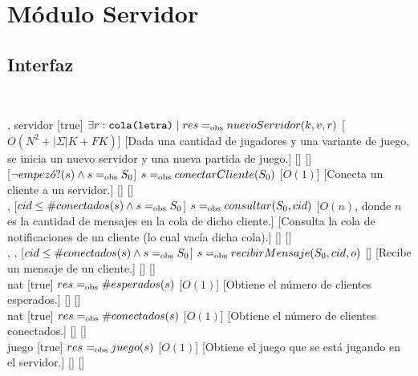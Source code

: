 \section{Módulo Servidor}
\begin{interfaz}{\subsection{Interfaz}}
  \\
  \usa{\falta}
  \par\noindent
  \begin{operaciones}
    {
      ,
    }{servidor}
    [true]
    {$\exists r: \texttt{cola(letra)} \mid res =_{\mathrm{obs}} nuevoServidor(k,v,r)$}
    [$O(N^{2}+|\Sigma|K+FK)$]
    [Dada una cantidad de jugadores y una variante de juego, se inicia un nuevo servidor y una nueva partida de juego.]
    [\falta]
    [\falta]\\

    \noindent{}
    {
    }{}
    [$\lnot empez\acute{o}?(s) \land s=_{\mathrm{obs}} S_{0}$]
    {$s=_{\mathrm{obs}} conectarCliente(S_{0})$}
    [$O(1)$]
    [Conecta un cliente a un servidor.]
    [\falta]
    [\falta]\\

    \noindent{}
    {
      ,
    }{}
    [$cid\leq \#conectados(s) \land s=_{\mathrm{obs}} S_{0}$]
    {$s=_{\mathrm{obs}} consultar(S_{0},cid)$}
    [$O(n)$, donde $n$ es la cantidad de mensajes en la cola de dicho cliente.]
    [Consulta la cola de notificaciones de un cliente (lo cual vacía dicha cola).]
    [\falta]
    [\falta]\\

    \noindent{}
    {
      ,
      ,
    }{}
    [$cid\leq \#conectados(s) \land s=_{\mathrm{obs}} S_{0}$]
    {$s=_{\mathrm{obs}} recibirMensaje(S_{0},cid,o)$}
    [\falta]
    [Recibe un mensaje de un cliente.]
    [\falta]
    [\falta]\\

    \noindent{}
    {
    }{nat}
    [true]
    {$res=_{\mathrm{obs}} \#esperados(s)$}
    [$O(1)$]
    [Obtiene el número de clientes esperados.]
    [\falta]
    [\falta]\\

    \noindent{}
    {
    }{nat}
    [true]
    {$res=_{\mathrm{obs}} \#conectados(s)$}
    [$O(1)$]
    [Obtiene el número de clientes conectados.]
    [\falta]
    [\falta]\\

    \noindent{}
    {
    }{juego}
    [true]
    {$res=_{\mathrm{obs}} juego(s)$}
    [$O(1)$]
    [Obtiene el juego que se está jugando en el servidor.]
    [\falta]
    [\falta]\\
  \end{operaciones}
\end{interfaz}
